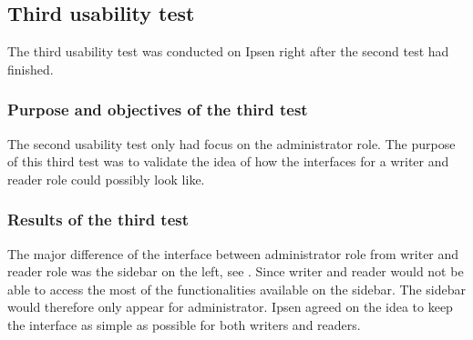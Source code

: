 

\subsection{Third usability test}\label{thirdtest}
The third usability test was conducted on Ipsen right after the second test had finished.

\subsubsection*{Purpose and objectives of the third test}
The second usability test only had focus on the administrator role.
The purpose of this third test was to validate the idea of how the interfaces for a writer and reader role could possibly look like.

\subsubsection*{Results of the third test}
The major difference of the interface between administrator role from writer and reader role was the sidebar on the left, see .
Since writer and reader would not be able to access the most of the functionalities available on the sidebar.
The sidebar would therefore only appear for administrator.
Ipsen agreed on the idea to keep the interface as simple as possible for both writers and readers.

